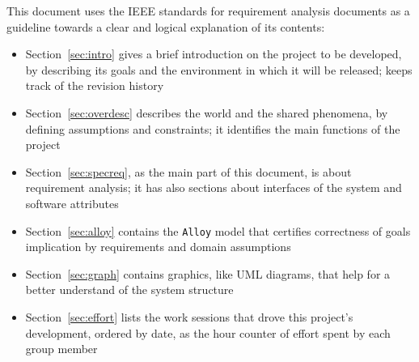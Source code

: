     This document uses the IEEE standards for requirement analysis documents \cite{ieee830} as a guideline towards a clear and logical explanation of its contents:
    \begin{itemize}
      \item Section~\ref{sec:intro} gives a brief introduction on the project to be developed, by describing its goals and the environment in which it will be released; keeps track of the revision history
      \item Section~\ref{sec:overdesc} describes the world and the shared phenomena, by defining assumptions and constraints; it identifies the main functions of the project
      \item Section~\ref{sec:specreq}, as the main part of this document, is about requirement analysis; it has also sections about interfaces of the system and software attributes
      \item Section~\ref{sec:alloy} contains the \texttt{Alloy} model that certifies correctness of goals implication by requirements and domain assumptions
      \item Section~\ref{sec:graph} contains graphics, like UML diagrams, that help for a better understand of the system structure
      \item Section~\ref{sec:effort} lists the work sessions that drove this project's development, ordered by date, as the hour counter of effort spent by each group member
    \end{itemize}
